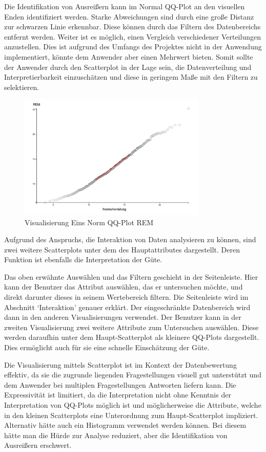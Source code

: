 \documentclass[usegeometry=true]{scrartcl}
\begin{document}
Die Identifikation von Ausreißern kann im Normal QQ-Plot an den visuellen Enden identifiziert werden. Starke Abweichungen sind durch eine große Distanz zur schwarzen Linie erkennbar. Diese können durch das Filtern des Datenbereichs entfernt werden. Weiter ist es möglich, einen Vergleich verschiedener Verteilungen anzustellen. Dies ist aufgrund des Umfangs des Projektes nicht in der Anwendung implementiert, könnte dem Anwender aber einen Mehrwert bieten. Somit sollte der Anwender durch den Scatterplot in der Lage sein, die Datenverteilung und Interpretierbarkeit einzuschätzen und diese in geringem Maße mit den Filtern zu selektieren.

\begin{figure}[h]
  \centering
  \includegraphics[width = 0.8\textwidth]{NormQQPlott.JPG}
  \caption{Visualisierung Eins  Norm QQ-Plot REM }
\end{figure}


Aufgrund des Anspruchs, die Interaktion von Daten analysieren zu können, sind zwei weitere Scatterplots unter dem des Hauptattributes dargestellt. Deren Funktion ist ebenfalls die Interpretation der Güte.

Das oben erwähnte Auswählen und das Filtern geschieht in der Seitenleiste. Hier kann der Benutzer das Attribut auswählen, das er untersuchen möchte, und direkt darunter dieses in seinem Wertebereich filtern. Die Seitenleiste wird im Abschnitt `Interaktion' genauer erklärt.
Der eingeschränkte Datenbereich wird dann in den anderen Visualisierungen verwendet.
Der Benutzer kann in der zweiten Visualisierung zwei weitere Attribute zum Untersuchen auswählen. Diese werden daraufhin unter dem Haupt-Scatterplot als kleinere QQ-Plots dargestellt. Dies ermöglicht auch für sie eine schnelle Einschätzung der Güte.

Die Visualisierung mittels Scatterplot ist im Kontext der Datenbewertung effektiv, da sie die zugrunde liegenden Fragestellungen visuell gut unterstützt und dem Anwender bei multiplen Fragestellungen Antworten liefern kann. Die Expressivität ist limitiert, da die Interpretation nicht ohne Kenntnis der Interpretation von QQ-Plots möglich ist und möglicherweise die Attribute, welche in den kleinen Scatterplots eine Unterordnung zum Haupt-Scatterplot impliziert.
Alternativ hätte auch ein Histogramm verwendet werden können. Bei diesem hätte man die Hürde zur Analyse reduziert, aber die Identifikation von Ausreißern erschwert.
\end{document}
